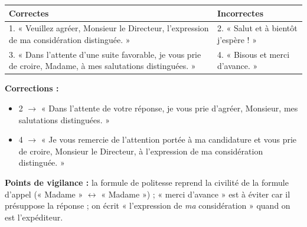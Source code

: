 \documentclass[11pt]{article}
\begin{document}
\begin{corrige}
\begin{center}
\begin{tabularx}{\linewidth}{|X|X|}
\hline
\rowcolor{popgreenL} \textbf{Correctes} & \textbf{Incorrectes} \\
\hline
1. « Veuillez agréer, Monsieur le Directeur, l'expression de ma considération distinguée. » & 2. « Salut et à bientôt j'espère ! » \\
\hline
3. « Dans l'attente d'une suite favorable, je vous prie de croire, Madame, à mes salutations distinguées. » & 4. « Bisous et merci d'avance. » \\
\hline
\end{tabularx}
\end{center}
\textbf{Corrections :}
\begin{itemize}
\item 2 $\rightarrow$ « Dans l'attente de votre réponse, je vous prie d'agréer, Monsieur, mes salutations distinguées. »
\item 4 $\rightarrow$ « Je vous remercie de l'attention portée à ma candidature et vous prie de croire, Monsieur le Directeur, à l'expression de ma considération distinguée. »
\end{itemize}
\textbf{Points de vigilance :} la formule de politesse reprend la civilité de la formule d'appel (« Madame » $\leftrightarrow$ « Madame ») ; « merci d'avance » est à éviter car il présuppose la réponse ; on écrit « l'expression de \emph{ma} considération » quand on est l'expéditeur.
\end{corrige}
\end{document}
